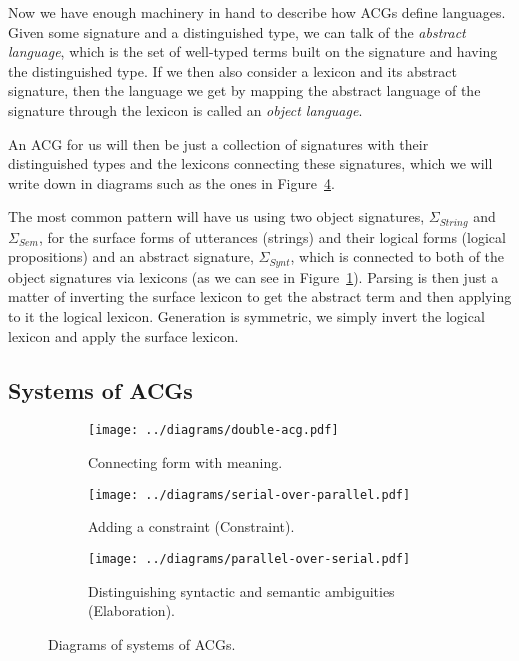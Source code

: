 \documentclass{llncs}
\begin{document}
Now we have enough machinery in hand to describe how ACGs define
languages. Given some signature and a distinguished type, we can talk of the
\emph{abstract language}, which is the set of well-typed terms built on the
signature and having the distinguished type. If we then also consider a
lexicon and its abstract signature, then the language we get by mapping the
abstract language of the signature through the lexicon is called an
\emph{object language}.

An ACG for us will then be just a collection of signatures with their
distinguished types and the lexicons connecting these signatures, which we
will write down in diagrams such as the ones in Figure~\ref{fig:acg-comp}.

The most common pattern will have us using two object signatures,
$\Sigma_{String}$ and $\Sigma_{Sem}$, for the surface forms of utterances
(strings) and their logical forms (logical propositions) and an abstract
signature, $\Sigma_{Synt}$, which is connected to both of the object
signatures via lexicons (as we can see in
Figure~\ref{fig:acg-comp-basic}). Parsing is then just a matter of inverting
the surface lexicon to get the abstract term and then applying to it the
logical lexicon. Generation is symmetric, we simply invert the logical lexicon
and apply the surface lexicon.

\subsection{Systems of ACGs}

\begin{figure}[t]
  \centering
  \begin{subfigure}[b]{0.25\textwidth}
    \centering
    \texttt{[image: ../diagrams/double-acg.pdf]}
    \caption{\label{fig:acg-comp-basic} Connecting form with meaning.}
  \end{subfigure}
  \qquad
  \begin{subfigure}[b]{0.25\textwidth}
    \centering
    \texttt{[image: ../diagrams/serial-over-parallel.pdf]}
    \caption{\label{fig:acg-comp-constr} Adding a constraint (Constraint).}
  \end{subfigure}
  \qquad
  \begin{subfigure}[b]{0.25\textwidth}
    \centering
    \texttt{[image: ../diagrams/parallel-over-serial.pdf]}
    \caption{\label{fig:acg-comp-sem} Distinguishing syntactic and
      semantic ambiguities (Elaboration).}
  \end{subfigure}
  \caption{\label{fig:acg-comp} Diagrams of systems of ACGs.}
\end{figure}
\end{document}
